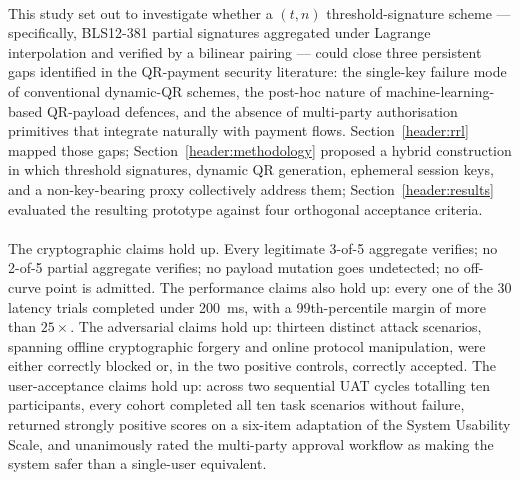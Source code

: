 \paragraph{}This study set out to investigate whether a $(t, n)$ threshold-signature scheme --- specifically, BLS12-381 partial signatures aggregated under Lagrange interpolation and verified by a bilinear pairing --- could close three persistent gaps identified in the QR-payment security literature: the single-key failure mode of conventional dynamic-QR schemes, the post-hoc nature of machine-learning-based QR-payload defences, and the absence of multi-party authorisation primitives that integrate naturally with payment flows. Section~\ref{header:rrl} mapped those gaps; Section~\ref{header:methodology} proposed a hybrid construction in which threshold signatures, dynamic QR generation, ephemeral session keys, and a non-key-bearing proxy collectively address them; Section~\ref{header:results} evaluated the resulting prototype against four orthogonal acceptance criteria.

\paragraph{}The cryptographic claims hold up. Every legitimate 3-of-5 aggregate verifies; no 2-of-5 partial aggregate verifies; no payload mutation goes undetected; no off-curve point is admitted. The performance claims also hold up: every one of the 30 latency trials completed under 200~ms, with a 99th-percentile margin of more than $25\times$. The adversarial claims hold up: thirteen distinct attack scenarios, spanning offline cryptographic forgery and online protocol manipulation, were either correctly blocked or, in the two positive controls, correctly accepted. The user-acceptance claims hold up: across two sequential UAT cycles totalling ten participants, every cohort completed all ten task scenarios without failure, returned strongly positive scores on a six-item adaptation of the System Usability Scale, and unanimously rated the multi-party approval workflow as making the system safer than a single-user equivalent.

